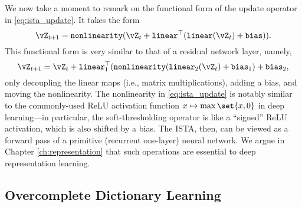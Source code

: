 \documentclass[../../book-main.tex]{subfiles}
\begin{document}
We now take a moment to remark on the functional form of the update operator in \eqref{eq:ista_update}. It takes the form 
\begin{equation}
    \vZ_{t + 1} = \texttt{nonlinearity}(\vZ_{t} + \texttt{linear}^{\top}(\texttt{linear}(\vZ_{t}) + \texttt{bias})).
\end{equation}
This functional form is very similar to that of a residual network layer, namely,
\begin{equation}
    \vZ_{t + 1} = \vZ_{t} + \texttt{linear}_{1}^{\top}(\texttt{nonlinearity}(\texttt{linear}_{2}(\vZ_{t}) + \texttt{bias}_{1}) + \texttt{bias}_{2},
\end{equation}
only decoupling the linear maps (i.e., matrix multiplications), adding a bias, and moving the nonlinearity. 
The nonlinearity in \eqref{eq:ista_update} is notably similar to the
commonly-used ReLU activation function $x \mapsto \max\set{x, 0}$ in deep
learning---in particular, the soft-thresholding operator is like a ``signed''
ReLU activation, which is also shifted by a bias.
The ISTA, then, can be viewed as a forward pass of a primitive (recurrent one-layer) neural network. We argue in Chapter \ref{ch:representation} that such operations are essential to deep representation learning.




\subsection{Overcomplete Dictionary Learning} 
\end{document}
